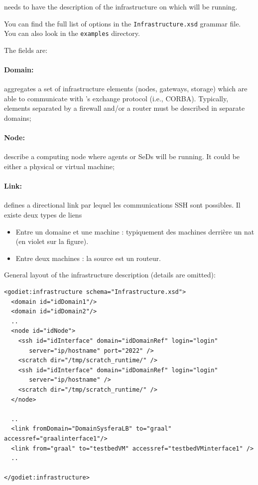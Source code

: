 \godiet needs to have the description of the infrastructure on which \diet will be running. 

\vspace{1cm}
You can find the full list of options in the \verb+Infrastructure.xsd+ grammar file. You can also look in the \verb+examples+ directory.

The fields are:

\paragraph{Domain:} aggregates a set of infrastructure elements (nodes, gateways, storage) which are able to communicate with \diet's exchange protocol (i.e., CORBA). Typically, elements separated by a firewall and/or a router must be described in separate domains;
\paragraph{Node:} describe a computing node where agents or SeDs will be running. It could be either a physical or virtual machine;

\paragraph{Link:} defines a directional link par lequel les communications SSH sont possibles. Il existe deux types de liens
\begin{itemize}
 \item Entre un domaine et une machine : typiquement des machines derrière un nat (en violet sur la figure).
 \item Entre deux machines : la source est un routeur.
\end{itemize}

\vspace{1cm}

General layout of the infrastructure description (details are omitted):
\begin{verbatim}
<godiet:infrastructure schema="Infrastructure.xsd">
  <domain id="idDomain1"/>
  <domain id="idDomain2"/>
  ..
  <node id="idNode">
    <ssh id="idInterface" domain="idDomainRef" login="login" 
       server="ip/hostname" port="2022" />
    <scratch dir="/tmp/scratch_runtime/" />
    <ssh id="idInterface" domain="idDomainRef" login="login"
       server="ip/hostname" />
    <scratch dir="/tmp/scratch_runtime/" />
  </node>

  ..
  <link fromDomain="DomainSysferaLB" to="graal" accessref="graalinterface1"/>
  <link from="graal" to="testbedVM" accessref="testbedVMinterface1" />
  ..

</godiet:infrastructure>
\end{verbatim}


